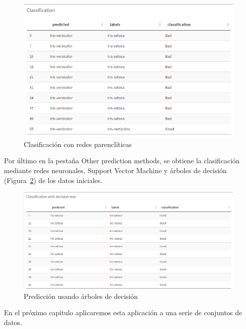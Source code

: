 \begin{figure}[tbph!]
	\centering
	\includegraphics[width=0.7\linewidth]{imagenes/clasificacion}
	\caption{Clasificación con redes parenclíticas}
	\label{fig:clasificacion}
\end{figure}

Por último en la pestaña Other prediction methods, se obtiene la clasificación mediante redes neuronales, Support Vector Machine y árboles de decisión (Figura~\ref{fig:prediccionML}) de los datos iniciales.\\

\begin{figure}[tbph!]
	\centering
	\includegraphics[width=0.7\linewidth]{imagenes/prediccionML}
	\caption{Predicción usando árboles de decisión}
	\label{fig:prediccionML}
\end{figure}

En el próximo capítulo aplicaremos esta aplicación a una serie de conjuntos de datos.